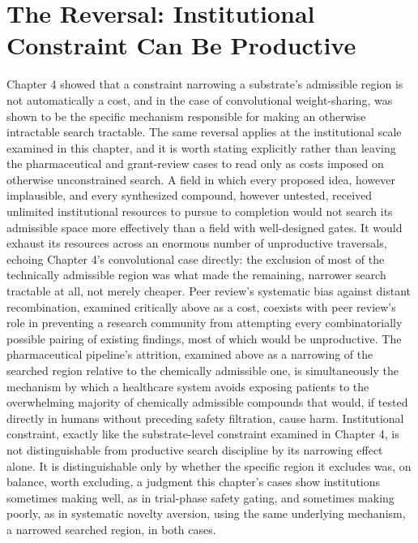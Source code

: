 \documentclass[11pt]{book}
\begin{document}
\section{The Reversal: Institutional Constraint Can Be Productive}

Chapter 4 showed that a constraint narrowing a substrate's admissible region is not automatically a cost, and in the case of convolutional weight-sharing, was shown to be the specific mechanism responsible for making an otherwise intractable search tractable. The same reversal applies at the institutional scale examined in this chapter, and it is worth stating explicitly rather than leaving the pharmaceutical and grant-review cases to read only as costs imposed on otherwise unconstrained search. A field in which every proposed idea, however implausible, and every synthesized compound, however untested, received unlimited institutional resources to pursue to completion would not search its admissible space more effectively than a field with well-designed gates. It would exhaust its resources across an enormous number of unproductive traversals, echoing Chapter 4's convolutional case directly: the exclusion of most of the technically admissible region was what made the remaining, narrower search tractable at all, not merely cheaper. Peer review's systematic bias against distant recombination, examined critically above as a cost, coexists with peer review's role in preventing a research community from attempting every combinatorially possible pairing of existing findings, most of which would be unproductive. The pharmaceutical pipeline's attrition, examined above as a narrowing of the searched region relative to the chemically admissible one, is simultaneously the mechanism by which a healthcare system avoids exposing patients to the overwhelming majority of chemically admissible compounds that would, if tested directly in humans without preceding safety filtration, cause harm. Institutional constraint, exactly like the substrate-level constraint examined in Chapter 4, is not distinguishable from productive search discipline by its narrowing effect alone. It is distinguishable only by whether the specific region it excludes was, on balance, worth excluding, a judgment this chapter's cases show institutions sometimes making well, as in trial-phase safety gating, and sometimes making poorly, as in systematic novelty aversion, using the same underlying mechanism, a narrowed searched region, in both cases.
\end{document}
